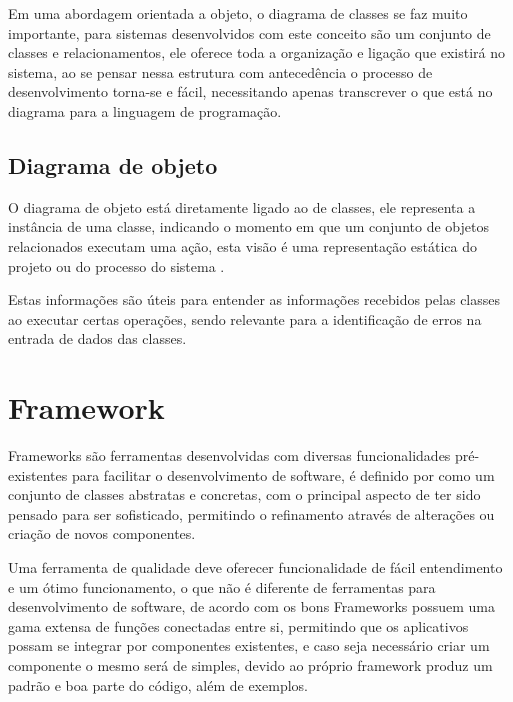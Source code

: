         Em uma abordagem orientada a objeto, o diagrama de classes se faz muito importante, para sistemas desenvolvidos com este conceito são um conjunto de classes e relacionamentos, ele oferece toda a organização e ligação que existirá no sistema, ao se pensar nessa estrutura com antecedência o processo de desenvolvimento torna-se e fácil, necessitando apenas transcrever o que está no diagrama para a linguagem de programação.
    
    
    \subsection{Diagrama de objeto}
        O diagrama de objeto está diretamente ligado ao de classes, ele representa a instância de uma classe, indicando o momento em que um conjunto de objetos relacionados executam uma ação, esta visão é uma representação estática do projeto ou do processo do sistema \cite[p.~188]{booch_uml:_2006}.

        Estas informações são úteis para entender as informações recebidos pelas classes ao executar certas operações, sendo relevante para a identificação de erros na entrada de dados das classes.
    
    
\section{Framework}
    Frameworks são ferramentas desenvolvidas com diversas funcionalidades pré-existentes para facilitar o desenvolvimento de software, é definido por  como um conjunto de classes abstratas e concretas, com o principal aspecto de ter sido pensado para ser sofisticado, permitindo o refinamento através de alterações ou criação de novos componentes.

    Uma ferramenta de qualidade deve oferecer funcionalidade de fácil entendimento e um ótimo funcionamento, o que não é diferente de ferramentas para desenvolvimento de software, de acordo com  os bons Frameworks possuem uma gama extensa de funções conectadas entre si, permitindo que os aplicativos possam se integrar por componentes existentes, e caso seja necessário criar um componente o mesmo será de simples, devido ao próprio framework produz um padrão e boa parte do código, além de exemplos.


